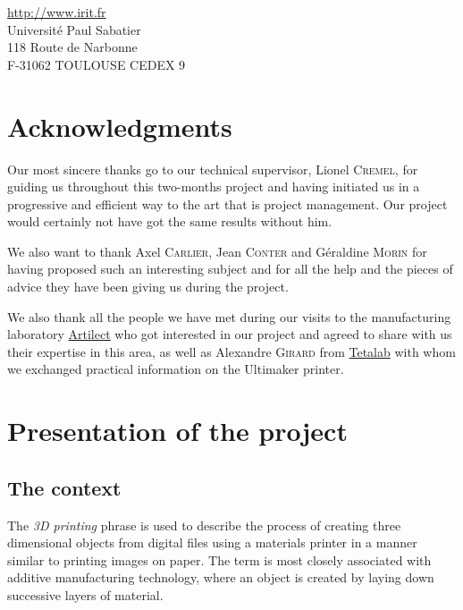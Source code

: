 \documentclass{report}
\begin{document}
\begin{center}
\url{http://www.irit.fr}\\
Université Paul Sabatier \\
118 Route de Narbonne \\
F-31062 TOULOUSE CEDEX 9
\end{center}

\thispagestyle{empty}

\newpage

\chapter*{Acknowledgments}

	Our most sincere thanks go to our technical supervisor, Lionel \textsc{Cremel}, for guiding us throughout this two-months project and having initiated us in a progressive and efficient way to the art that is project management. Our project would certainly not have got the same results without him.\\

\bigskip

	We also want to thank Axel \textsc{Carlier}, Jean \textsc{Conter} and Géraldine \textsc{Morin} for having proposed such an interesting subject and for all the help and the pieces of advice they have been giving us during the project.\\

\bigskip

	We also thank all the people we have met during our visits to the manufacturing laboratory \href{http://artilect.fr/}{Artilect} who got interested in our project and agreed to share with us their expertise in this area, as well as Alexandre \textsc{Girard} from \href{http://tetalab.org/}{Tetalab} with whom we exchanged practical information on the Ultimaker printer.


\tableofcontents

\chapter{Presentation of the project}

\section{The context}

	The \textit{3D printing} phrase is used to describe the process of creating three dimensional objects from digital files using a materials printer in a manner similar to printing images on paper. The term is most closely associated with additive manufacturing technology, where an object is created by laying down successive layers of material.\\
\end{document}

